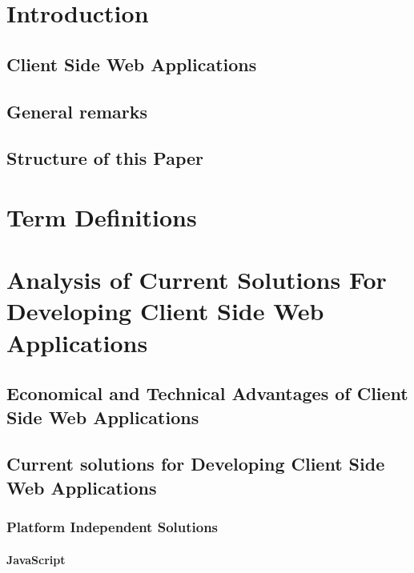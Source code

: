 

\tableofcontents
\newpage

\listoffigures

\chapter{Introduction}
 
 
 \section{Client Side Web Applications}
 \section{General remarks}
 \section{Structure of this Paper}
\chapter{Term Definitions}

\chapter{Analysis of Current Solutions For Developing Client Side Web Applications}
 \section{Economical and Technical Advantages of Client Side Web Applications}
 \section{Current solutions for Developing Client Side Web Applications}

  

  \subsection{Platform Independent Solutions}
  
   
   
   \subsubsection{JavaScript}
   
    
    
